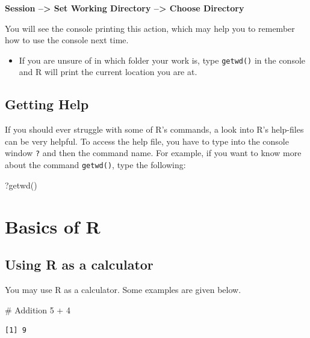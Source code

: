 \documentclass[
  letterpaper,
  DIV=11,
  numbers=noendperiod]{scrreprt}
\newenvironment{Shaded}{\begin{snugshade}}{\end{snugshade}}
\newcommand{\CommentTok}[1]{\textcolor[rgb]{0.37,0.37,0.37}{#1}}
\newcommand{\DecValTok}[1]{\textcolor[rgb]{0.68,0.00,0.00}{#1}}
\newcommand{\FunctionTok}[1]{\textcolor[rgb]{0.28,0.35,0.67}{#1}}
\newcommand{\NormalTok}[1]{\textcolor[rgb]{0.00,0.23,0.31}{#1}}
\newcommand{\SpecialCharTok}[1]{\textcolor[rgb]{0.37,0.37,0.37}{#1}}
\providecommand{\tightlist}{%
  \setlength{\itemsep}{0pt}\setlength{\parskip}{0pt}}\usepackage{longtable,booktabs,array}
\begin{document}
\textbf{Session --\textgreater{} Set Working Directory --\textgreater{}
Choose Directory}

You will see the console printing this action, which may help you to
remember how to use the console next time.

\begin{itemize}
\tightlist
\item
  If you are unsure of in which folder your work is, type
  \texttt{getwd()} in the console and R will print the current location
  you are at.
\end{itemize}

\section{Getting Help}\label{getting-help}

If you should ever struggle with some of R's commands, a look into R's
help-files can be very helpful. To access the help file, you have to
type into the console window \texttt{?} and then the command name. For
example, if you want to know more about the command \texttt{getwd()},
type the following:

\begin{Shaded}
\begin{Highlighting}[]
\NormalTok{?}\FunctionTok{getwd}\NormalTok{()}
\end{Highlighting}
\end{Shaded}

\chapter{Basics of R}\label{basics-of-r}

\section{Using R as a calculator}\label{using-r-as-a-calculator}

You may use R as a calculator. Some examples are given below.

\begin{Shaded}
\begin{Highlighting}[]
\CommentTok{\# Addition}
\DecValTok{5} \SpecialCharTok{+} \DecValTok{4}
\end{Highlighting}
\end{Shaded}

\begin{verbatim}
[1] 9
\end{verbatim}
\end{document}
